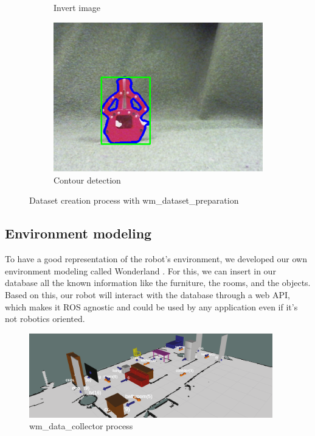 \documentclass[runningheads,a4paper]{llncs}
\begin{document}
\begin{figure}[h!]
\begin{subfigure}[b]{0.3\linewidth}
    \caption{Invert image}
  \end{subfigure}
  \begin{subfigure}[b]{0.3\linewidth}
    \includegraphics[width=\linewidth]{images/bounding_contours.png}
    \caption{Contour detection}
  \end{subfigure}
  \caption{Dataset creation process with wm\_dataset\_preparation}
  \label{fig:coffee}
\end{figure}  
 
\subsection{Environment modeling}
\tab To have a good representation of the robot's environment, we developed our own environment modeling called Wonderland \cite{wonderland}. For this, we can insert in our database all the known information like the furniture, the rooms, and the objects. Based on this, our robot will interact with the database through a web API, which makes it ROS agnostic and could be used by any application even if it's not robotics oriented.\\

\begin{figure}
  \centering
  \includegraphics[width=300pt]{images/wonderland.png}
  \caption{ wm\_data\_collector process}
\end{figure} 
\end{document}
